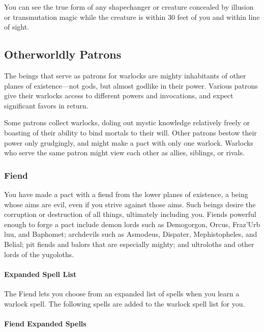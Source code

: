 \documentclass[
]{article}
\begin{document}
You can see the true form of any shapechanger or creature concealed by
illusion or transmutation magic while the creature is within 30 feet of
you and within line of sight.

\hypertarget{otherworldly-patrons}{%
\subsection{Otherworldly Patrons}\label{otherworldly-patrons}}

The beings that serve as patrons for warlocks are mighty inhabitants of
other planes of existence---not gods, but almost godlike in their power.
Various patrons give their warlocks access to different powers and
invocations, and expect significant favors in return.

Some patrons collect warlocks, doling out mystic knowledge relatively
freely or boasting of their ability to bind mortals to their will. Other
patrons bestow their power only grudgingly, and might make a pact with
only one warlock. Warlocks who serve the same patron might view each
other as allies, siblings, or rivals.

\hypertarget{fiend}{%
\subsubsection{Fiend}\label{fiend}}

You have made a pact with a fiend from the lower planes of existence, a
being whose aims are evil, even if you strive against those aims. Such
beings desire the corruption or destruction of all things, ultimately
including you. Fiends powerful enough to forge a pact include demon
lords such as Demogorgon, Orcus, Fraz'Urb luu, and Baphomet; archdevils
such as Asmodeus, Dispater, Mephistopheles, and Belial; pit fiends and
balors that are especially mighty; and ultroloths and other lords of the
yugoloths.

\hypertarget{expanded-spell-list}{%
\paragraph{Expanded Spell List}\label{expanded-spell-list}}

The Fiend lets you choose from an expanded list of spells when you learn
a warlock spell. The following spells are added to the warlock spell
list for you.

\hypertarget{fiend-expanded-spells}{%
\paragraph{Fiend Expanded Spells}\label{fiend-expanded-spells}}
\end{document}
